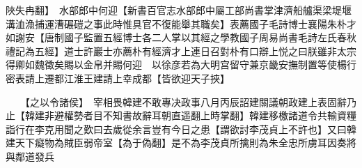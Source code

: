 陜失冉翻】　水部郎中何迎【新書百官志水部郎中屬工部尚書掌津濟船艫渠梁堤堰溝洫漁捕運漕碾磑之事此時惟具官不復能舉其職矣】表薦國子毛詩博士襄陽朱朴才如謝安【唐制國子監置五經博士各二人掌以其經之學教國子周易尚書毛詩左氏春秋禮記為五經】道士許巖士亦薦朴有經濟才上連日召對朴有口辯上悦之曰朕雖非太宗得卿如魏徵矣賜以金帛并賜何迎　以徐彦若為大明宫留守兼京畿安撫制置等使楊行密表請上遷都江淮王建請上幸成都【皆欲迎天子挾】

　　【之以令諸侯】　宰相畏韓建不敢專决政事八月丙辰詔建關議朝政建上表固辭乃止【韓建非避權勢者目不知書故辭耳朝直遥翻上時掌翻】韓建移檄諸道令共輸資糧詣行在李克用聞之歎曰去歲從余言豈有今日之患【謂欲討李茂貞上不許也】又曰韓建天下癡物為賊臣弱帝室【為于偽翻】是不為李茂貞所擒則為朱全忠所虜耳因奏將與鄰道發兵